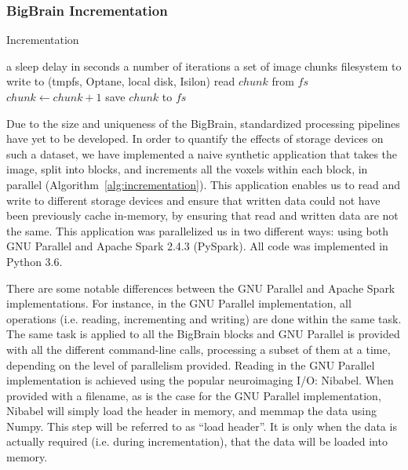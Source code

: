 \documentclass[conference]{IEEEtran}
\newcommand{\Desc}[2]{\State \makebox[2em][l]{#1}#2}
\newcommand{\bigbrain}{BigBrain\xspace}
\begin{document}
\subsubsection{ \bigbrain Incrementation}

\begin{algorithm}\caption{Incrementation}\label{alg:incrementation}
    \begin{algorithmic}[1]
    \Input
        \Desc{$x$}{a sleep delay in seconds}
        \Desc{$n$}{a number of iterations}
        \Desc{$C$}{a set of image chunks}
        \Desc{$fs$}{filesystem to write to (tmpfs, Optane, local disk, Isilon)}
    \EndInput
        \State read $chunk$ from $fs$
        \State $chunk\gets chunk+1$
        \State save $chunk$ to $fs$
    \EndFor
    \end{algorithmic}
\end{algorithm}  

Due to the size and uniqueness of the \bigbrain, standardized processing pipelines
have yet to be developed. In order to quantify the effects of storage devices
on such a dataset, we have implemented a naive synthetic application that takes 
the image, split into blocks, and increments all the voxels within each block, in parallel (Algorithm~\ref{alg:incrementation}).
This application
enables us to read and write to different storage devices and ensure that written
data could not have been previously cache
in-memory, by ensuring that read and written data are not the same. This application
was parallelized us in two different ways: using both GNU Parallel and Apache Spark 2.4.3 (PySpark). 
All code was implemented in Python 3.6.

There are some notable differences between the GNU Parallel and Apache Spark implementations.
For instance, in the GNU Parallel implementation, all operations (i.e. reading, incrementing and writing)
are done within the same task. The same task is applied to all the \bigbrain blocks and GNU Parallel is 
provided with all the different command-line calls, processing a subset of them at a time,
depending on the level of parallelism provided. Reading in the GNU Parallel implementation 
is achieved using the popular neuroimaging I/O: Nibabel. When provided with a filename, as is the case
for the GNU Parallel implementation, Nibabel will simply load the header in memory, and memmap the data
using Numpy. This step will be referred to as ``load header''. It is only when the data is actually required
(i.e. during incrementation), that the data will be loaded into memory.
\end{document}
